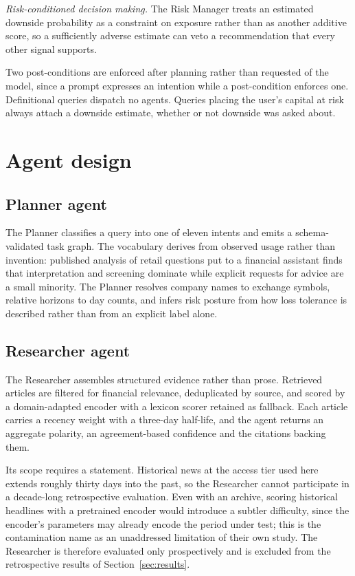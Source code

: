 \documentclass[pdflatex,sn-apa]{sn-jnl}%
\theoremstyle{thmstyleone}%
\theoremstyle{thmstyletwo}%
\theoremstyle{thmstylethree}%
\begin{document}
\emph{Risk-conditioned decision making.} The Risk Manager treats an estimated
downside probability as a constraint on exposure rather than as another additive
score, so a sufficiently adverse estimate can veto a recommendation that every
other signal supports.

Two post-conditions are enforced after planning rather than requested of the
model, since a prompt expresses an intention while a post-condition enforces
one. Definitional queries dispatch no agents. Queries placing the user's capital
at risk always attach a downside estimate, whether or not downside was asked
about.

\section{Agent design}\label{sec:agents}

\subsection{Planner agent}\label{subsec:planner}

The Planner classifies a query into one of eleven intents and emits a
schema-validated task graph. The vocabulary derives from observed usage rather
than invention: published analysis of retail questions put to a financial
assistant finds that interpretation and screening dominate while explicit
requests for advice are a small minority. The Planner resolves company names to
exchange symbols, relative horizons to day counts, and infers risk posture from
how loss tolerance is described rather than from an explicit label alone.

\subsection{Researcher agent}\label{subsec:researcher}

The Researcher assembles structured evidence rather than prose. Retrieved
articles are filtered for financial relevance, deduplicated by source, and
scored by a domain-adapted encoder \citep{araci2019finbert} with a lexicon
scorer retained as fallback. Each article carries a recency weight with a
three-day half-life, and the agent returns an aggregate polarity, an
agreement-based confidence and the citations backing them.

Its scope requires a statement. Historical news at the access tier used here
extends roughly thirty days into the past, so the Researcher cannot participate
in a decade-long retrospective evaluation. Even with an archive, scoring
historical headlines with a pretrained encoder would introduce a subtler
difficulty, since the encoder's parameters may already encode the period under
test; this is the contamination \citet{li2025finsaber} name as an unaddressed
limitation of their own study. The Researcher is therefore evaluated only
prospectively and is excluded from the retrospective results of
Section~\ref{sec:results}.
\end{document}

